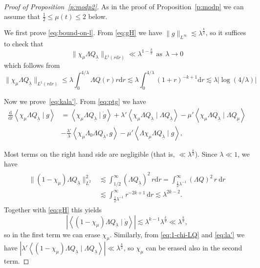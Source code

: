 \documentclass[10pt,reqno]{amsart}
\newcommand{\la}{\lambda}
\newcommand{\La}{\Lambda}
\newcommand{\ang}[1]{\left\langle{#1}\right\rangle}
\newcommand{\abs}[1]{\left\lvert{#1}\right\rvert}
\newcommand{\EQ}[1]{\begin{equation}\begin{split} #1 \end{split}\end{equation}}
\numberwithin{equation}{section}
\theoremstyle{remark}
\newcommand{\mas}{{\ \ \text{as} \ \ }}
\newcommand{\dd}[1]{\frac{\ud}{\ud{#1}}}
\newcommand{\ula}{\underline{\lambda}}
\newcommand{\umu}{\underline{\mu}}
\newcommand{\ud}{\mathrm{d}}
\newcommand{\0}{\emptyset}
\begin{document}
\begin{proof}[Proof of Proposition~\ref{p:modp2}]


As in the proof of Proposition~\ref{p:modp} we can assume that $\frac 12 \le \mu(t) \le 2$ below. 

We first prove \eqref{eq:bound-on-l}. From \eqref{eq:gH} we have $\|g\|_{L^\infty} \lesssim \lambda^\frac k2$, so it suffices
to check that
\begin{equation}
\label{eq:bound-on-l-2}
\|\chi_\mu \Lambda Q_{\ula}\|_{L^1(r\ud r)}  \ll \lambda^{1-\frac k2} \mas \la \to 0 %
\end{equation}
which follows from
\begin{equation}
\|\chi_\mu \Lambda Q_{\ula}\|_{L^1(r\ud r)} \leq \lambda \int_0^{4/\lambda}\Lambda Q(r)r\ud r
\lesssim  \la \int_0^{4/\lambda} (1+r)^{-k+1}\ud r \lesssim  \la \abs{\log(4/\lambda)} %
\end{equation}

Now we prove~\eqref{eq:kala'}.
From \eqref{eq:ptg} we have
\begin{equation}
\label{eq:bound-on-l-666}
\begin{aligned}
\dd t\ang{\chi_\mu \Lambda Q_{\ula} \mid g} &= \ang{\chi_\mu \Lambda Q_{\ula}\mid \dot g} + \lambda'\ang{ \chi_\mu \Lambda Q_{\ula}\mid \Lambda Q_{\ula}}
- \mu'\ang{\chi_\mu \Lambda Q_{\ula}\mid \Lambda Q_{\umu}} \\
&-\frac{\lambda'}{\lambda}\ang{\chi_\mu \Lambda_0\Lambda Q_{\ula}, g} - \mu'\ang{ \Lambda \chi_{\umu}\Lambda Q_{\ula}\mid g},
\end{aligned}
\end{equation}

Most terms on the right hand side are negligible (that is, $\ll \lambda^\frac k2$).
  Since $\la \ll 1$, we have
  \EQ{
  \begin{aligned}
  \label{eq:1-chi-LQ}
 \|(1- \chi_\mu) \La Q_{\ula}\|_{L^2}^2 &\lesssim \int_{1/2}^\infty (\La Q_{\ula})^2 \, r \ud r  = \int_{\frac 12 \la^{-1}}^{\infty}  (\La Q)^2 \, r \ \ud r \\
 &\lesssim \int_{\frac 12 \la^{-1}}^\infty r^{-2k+1} \, \ud r \lesssim \la^{2k-2}.
 \end{aligned}
  }
  Together with \eqref{eq:gH} this yields
  \begin{equation}
  \abs{ \ang{(1-\chi_\mu) \La Q_{\ula} \mid \dot g}} \lesssim \la^{k-1}\la^\frac k2 \ll \lambda^\frac k2,
  \end{equation}
  so in the first term we can erase $\chi_\mu$.
 Similarly, from \eqref{eq:1-chi-LQ} and \eqref{eq:la'} we have $\abs{\lambda'\ang{(1-\chi_\mu)\Lambda Q_{\ula}\mid
\Lambda Q_{\ula}}} \ll \lambda^\frac k2$, so $\chi_\mu$ can be erased also in the second term.


\end{proof}
\end{document}
